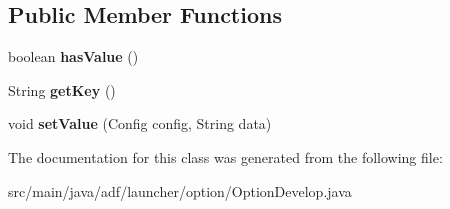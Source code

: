 \subsection*{Public Member Functions}
\begin{DoxyCompactItemize}
\item 
\hypertarget{classadf_1_1launcher_1_1option_1_1OptionDevelop_a96edb876b291c2e9710a9fad7571ec3a}{}\label{classadf_1_1launcher_1_1option_1_1OptionDevelop_a96edb876b291c2e9710a9fad7571ec3a} 
boolean {\bfseries has\+Value} ()
\item 
\hypertarget{classadf_1_1launcher_1_1option_1_1OptionDevelop_a9f32ccef5ece532e26b392f397f1daf3}{}\label{classadf_1_1launcher_1_1option_1_1OptionDevelop_a9f32ccef5ece532e26b392f397f1daf3} 
String {\bfseries get\+Key} ()
\item 
\hypertarget{classadf_1_1launcher_1_1option_1_1OptionDevelop_acb1ec49d9f40685a57faab7ad40ad0a1}{}\label{classadf_1_1launcher_1_1option_1_1OptionDevelop_acb1ec49d9f40685a57faab7ad40ad0a1} 
void {\bfseries set\+Value} (Config config, String data)
\end{DoxyCompactItemize}


The documentation for this class was generated from the following file\+:\begin{DoxyCompactItemize}
\item 
src/main/java/adf/launcher/option/Option\+Develop.\+java\end{DoxyCompactItemize}
